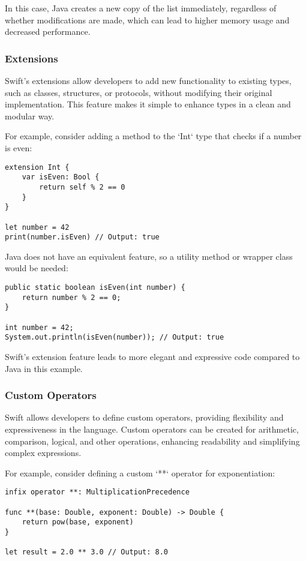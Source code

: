 In this case, Java creates a new copy of the list immediately, regardless of whether modifications are made, which can lead to higher memory usage and decreased performance.

\subsubsection{Extensions}
Swift's extensions allow developers to add new functionality to existing types, such as classes, structures, or protocols, without modifying their original implementation. This feature makes it simple to enhance types in a clean and modular way.

For example, consider adding a method to the `Int` type that checks if a number is even:

\begin{verbatim}
extension Int {
    var isEven: Bool {
        return self % 2 == 0
    }
}

let number = 42
print(number.isEven) // Output: true
\end{verbatim}

Java does not have an equivalent feature, so a utility method or wrapper class would be needed:

\begin{verbatim}
public static boolean isEven(int number) {
    return number % 2 == 0;
}

int number = 42;
System.out.println(isEven(number)); // Output: true
\end{verbatim}

Swift's extension feature leads to more elegant and expressive code compared to Java in this example.

\subsubsection{Custom Operators}
Swift allows developers to define custom operators, providing flexibility and expressiveness in the language. Custom operators can be created for arithmetic, comparison, logical, and other operations, enhancing readability and simplifying complex expressions.

For example, consider defining a custom `**` operator for exponentiation:

\begin{verbatim}
infix operator **: MultiplicationPrecedence

func **(base: Double, exponent: Double) -> Double {
    return pow(base, exponent)
}

let result = 2.0 ** 3.0 // Output: 8.0
\end{verbatim}

